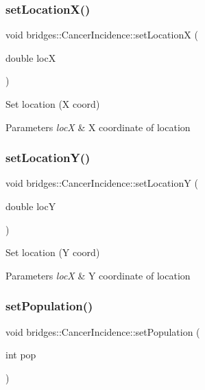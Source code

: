 \subsubsection{\texorpdfstring{set\+Location\+X()}{setLocationX()}}
{\footnotesize\ttfamily void bridges\+::\+Cancer\+Incidence\+::set\+LocationX (\begin{DoxyParamCaption}\item[{double}]{locX }\end{DoxyParamCaption})\hspace{0.3cm}{\ttfamily [inline]}}

Set location (X coord)


\begin{DoxyParams}{Parameters}
{\em locX} & X coordinate of location \\
\hline
\end{DoxyParams}
\mbox{\label{classbridges_1_1_cancer_incidence_a8ca0a21c2c5153b11adf6712e6648579}} 
\subsubsection{\texorpdfstring{set\+Location\+Y()}{setLocationY()}}
{\footnotesize\ttfamily void bridges\+::\+Cancer\+Incidence\+::set\+LocationY (\begin{DoxyParamCaption}\item[{double}]{locY }\end{DoxyParamCaption})\hspace{0.3cm}{\ttfamily [inline]}}

Set location (Y coord)


\begin{DoxyParams}{Parameters}
{\em locX} & Y coordinate of location \\
\hline
\end{DoxyParams}
\mbox{\label{classbridges_1_1_cancer_incidence_aaade0295abaeeabb23b9e03d5ffd364a}} 
\subsubsection{\texorpdfstring{set\+Population()}{setPopulation()}}
{\footnotesize\ttfamily void bridges\+::\+Cancer\+Incidence\+::set\+Population (\begin{DoxyParamCaption}\item[{int}]{pop }\end{DoxyParamCaption})\hspace{0.3cm}{\ttfamily [inline]}}

